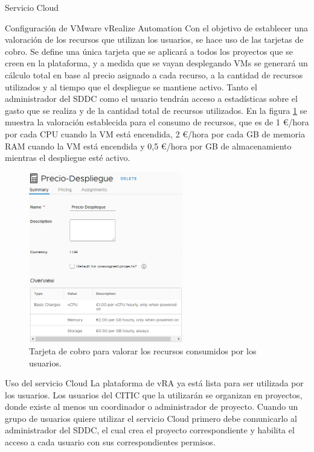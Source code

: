 \begin{subsection}{Servicio Cloud}
\begin{subsubsection}{Configuración de VMware vRealize Automation}
        Con el objetivo de establecer una valoración de los recursos que utilizan los usuarios, se hace uso de las tarjetas de cobro. Se define una única tarjeta que se aplicará a todos los proyectos que se creen en la plataforma, y a medida que se vayan desplegando VMs se generará un cálculo total en base al precio asignado a cada recurso, a la cantidad de recursos utilizados y al tiempo que el despliegue se mantiene activo. Tanto el administrador del SDDC como el usuario tendrán acceso a estadísticas sobre el gasto que se realiza y de la cantidad total de recursos utilizados. En la figura \ref{fig:pricing-card} se muestra la valoración establecida para el consumo de recursos, que es de 1 €/hora por cada CPU cuando la VM está encendida, 2 €/hora por cada GB de memoria RAM cuando la VM está encendida y 0,5 €/hora por GB de almacenamiento mientras el despliegue esté activo. 
        \begin{figure}[h]
            \centering
            \includegraphics[width=0.6\textwidth]{imaxes/pruebaconcepto/vrealize/pricing-card.png}
            \caption{Tarjeta de cobro para valorar los recursos consumidos por los usuarios.}
            \label{fig:pricing-card}
        \end{figure}
        \FloatBarrier

    \end{subsubsection}

    \begin{subsubsection}{Uso del servicio Cloud}
        La plataforma de vRA ya está lista para ser utilizada por los usuarios. Los usuarios del CITIC que la utilizarán se organizan en proyectos, donde existe al menos un coordinador o administrador de proyecto. Cuando un grupo de usuarios quiere utilizar el servicio Cloud primero debe comunicarlo al administrador del SDDC, el cual crea el proyecto correspondiente y habilita el acceso a cada usuario con sus correspondientes permisos.


\end{subsubsection}
\end{subsection}
